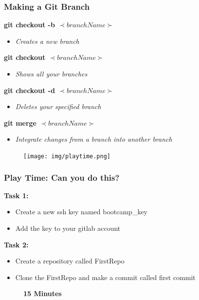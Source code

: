 \documentclass{beamer}
\begin{document}
\begin{frame}
	\frametitle{\textbf{Making a Git Branch}}
		

	\textbf{git checkout -b \(\prec branchName \succ\)}
	\begin{itemize}
		\item \textit{Creates a new branch}
	\end{itemize}
	\vspace{0.25cm}

	\textbf{git checkout \(\prec branchName \succ\)}
	\begin{itemize}
		\item \textit{Shows all your branches}
	\end{itemize}
	\vspace{0.25cm}

	\textbf{git checkout -d \(\prec branchName \succ\)}
	\begin{itemize}
		\item \textit{Deletes your specified branch}
	\end{itemize}
	\vspace{0.25cm}

	\textbf{git merge \(\prec branchName \succ\)}
	\begin{itemize}
		\item \textit{Integrate changes from a branch into another branch}
	\end{itemize}
	
\end{frame}

\begin{frame}
	\begin{figure}[h]
	\centering
	\texttt{[image: img/playtime.png]} 
	\end{figure}
\end{frame}

\begin{frame}
	\frametitle{\textbf{Play Time: Can you do this?}}
	\textbf{Task 1:}
	\begin{itemize}
	\item Create a new ssh key named bootcamp\_key
	\item Add the key to your gitlab account 
	\end{itemize}
	
	\vspace{1cm}

	\textbf{Task 2:}
	\begin{itemize}
	\item Create a repository called FirstRepo
	\item Clone the FirstRepo and make a commit called first commit
	\end{itemize}

	\vspace{1cm}

	\begin{figure}[h]
	\centering
	\textbf{15 Minutes}
	\end{figure}
\end{frame}
\end{document}
